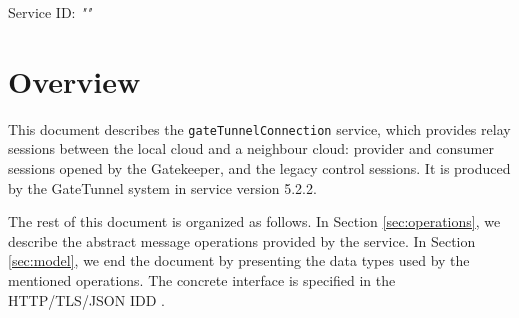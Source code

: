 \documentclass[a4paper]{arrowhead}
\begin{document}
\sloppy

\ArrowheadSetup

\begin{center}
  \vspace*{1cm}
  \huge{\arrowtitle}

  \vspace*{0.2cm}
  \LARGE{\arrowtype}
  \vspace*{1cm}

  \Large{Service ID: \textit{"\arrowid"}}

  \vspace*{\fill}


  \vspace*{1cm}
  \vspace*{\fill}

  \begin{abstract}
    This document describes the \texttt{gate\allowbreak{}Tunnel\allowbreak{}Connection} service, version 5.2.2, produced by the GateTunnel support system of Arrowhead 5.2.2.
  \end{abstract}

  \vspace*{1cm}
\end{center}

\newpage

\tableofcontents
\newpage

\section{Overview}
\label{sec:overview}

This document describes the \texttt{gate\allowbreak{}Tunnel\allowbreak{}Connection} service, which provides relay sessions between the local cloud and a neighbour cloud: provider and consumer sessions opened by the Gatekeeper, and the legacy control sessions.
It is produced by the GateTunnel system \cite{gt-sysd} in service version 5.2.2.

The rest of this document is organized as follows.
In Section \ref{sec:operations}, we describe the abstract message operations provided by the service.
In Section \ref{sec:model}, we end the document by presenting the data types used by the mentioned operations.
The concrete interface is specified in the HTTP/TLS/JSON IDD \cite{gt-gateTunnelConnection-http-idd}.
\end{document}
